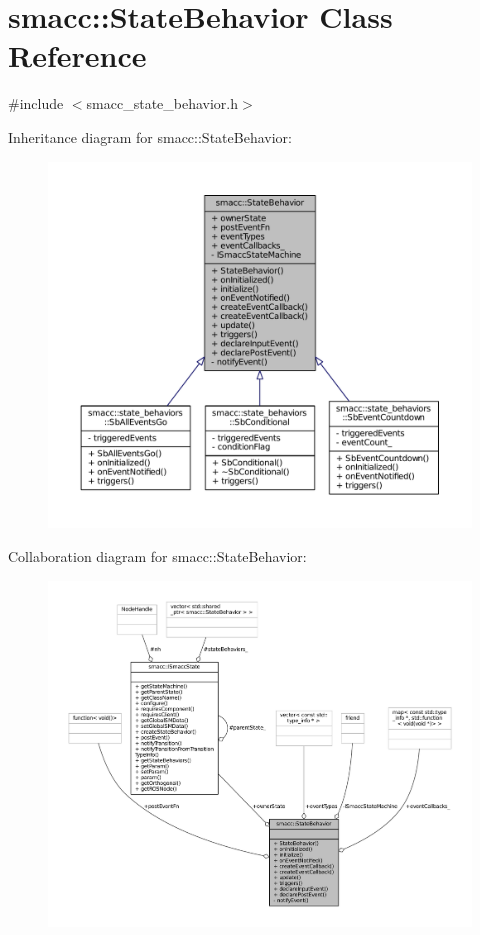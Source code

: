 \hypertarget{classsmacc_1_1StateBehavior}{}\section{smacc\+:\+:State\+Behavior Class Reference}
\label{classsmacc_1_1StateBehavior}


{\ttfamily \#include $<$smacc\+\_\+state\+\_\+behavior.\+h$>$}



Inheritance diagram for smacc\+:\+:State\+Behavior\+:
\nopagebreak
\begin{figure}[H]
\begin{center}
\leavevmode
\includegraphics[width=350pt]{classsmacc_1_1StateBehavior__inherit__graph}
\end{center}
\end{figure}


Collaboration diagram for smacc\+:\+:State\+Behavior\+:
\nopagebreak
\begin{figure}[H]
\begin{center}
\leavevmode
\includegraphics[width=350pt]{classsmacc_1_1StateBehavior__coll__graph}
\end{center}
\end{figure}
